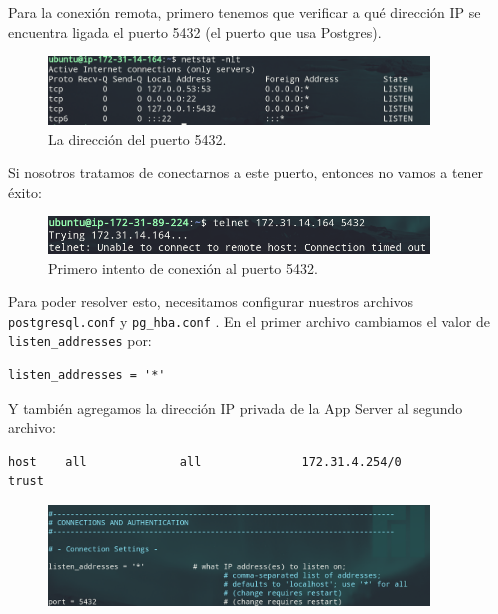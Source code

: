 \documentclass{article}
\newcommand{\ttt}[1]{%
\texttt{#1}%
}
\begin{document}
Para la conexión remota, primero tenemos que verificar a qué
dirección IP se encuentra ligada el puerto 5432 (el puerto
que usa Postgres).

\begin{figure}[H]
  \centering
  \includegraphics[width=0.9\textwidth]{DATASERVER/exhibitF}
  \caption{La dirección del puerto 5432.}
  \label{fig:DATASERVER-E}
\end{figure}

Si nosotros tratamos de conectarnos a este puerto, entonces no
vamos a tener éxito:

\begin{figure}[H]
  \centering
  \includegraphics[width=0.9\textwidth]{DATASERVER/exhibitG}
  \caption{Primero intento de conexión al puerto 5432.}
  \label{fig:DATASERVER-G}
\end{figure}

Para poder resolver esto, necesitamos configurar nuestros
archivos \ttt{postgresql.conf} y \ttt{pg\_hba.conf}.
En el primer archivo cambiamos el valor de
\ttt{listen\_addresses} por:

\begin{lstlisting}
listen_addresses = '*'
\end{lstlisting}

Y también agregamos la dirección IP privada de la App
Server  al segundo archivo:
\begin{lstlisting}
host    all             all              172.31.4.254/0                       trust
\end{lstlisting}

\begin{figure}[H]
  \centering
  \includegraphics[width=0.9\textwidth]{DATASERVER/exhibitI}
  \label{fig:DATASERVER-I}
\end{figure}
\end{document}
